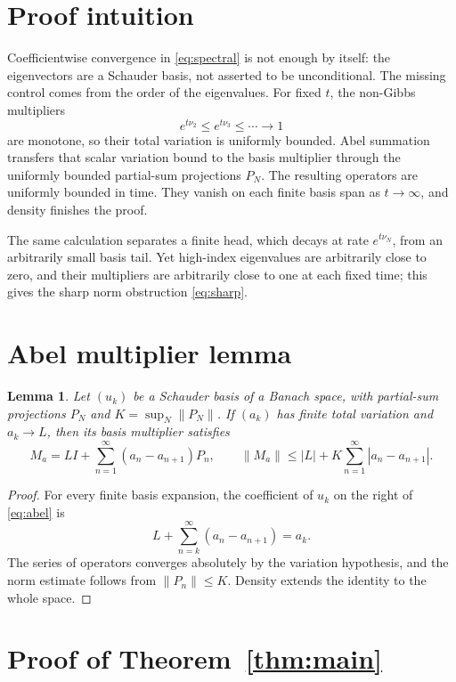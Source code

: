 \documentclass[11pt]{article}
\newtheorem{lemma}{Lemma}
\begin{document}
\section{Proof intuition}

Coefficientwise convergence in \eqref{eq:spectral} is not enough by itself:
the eigenvectors are a Schauder basis, not asserted to be unconditional.
The missing control comes from the order of the eigenvalues.  For fixed $t$,
the non-Gibbs multipliers
\[
 e^{t\nu_2}\leq e^{t\nu_3}\leq\cdots\longrightarrow1
\]
are monotone, so their total variation is uniformly bounded.  Abel summation
transfers that scalar variation bound to the basis multiplier through the
uniformly bounded partial-sum projections $P_N$.  The resulting operators are
uniformly bounded in time.  They vanish on each finite basis span as
$t\to\infty$, and density finishes the proof.

The same calculation separates a finite head, which decays at rate
$e^{t\nu_N}$, from an arbitrarily small basis tail.  Yet high-index
eigenvalues are arbitrarily close to zero, and their multipliers are
arbitrarily close to one at each fixed time; this gives the sharp norm
obstruction \eqref{eq:sharp}.

\section{Abel multiplier lemma}

\begin{lemma}\label{lem:abel}
Let $(u_k)$ be a Schauder basis of a Banach space, with partial-sum
projections $P_N$ and $K=\sup_N\|P_N\|$.  If $(a_k)$ has finite total
variation and $a_k\to L$, then its basis multiplier satisfies
\begin{equation}\label{eq:abel}
 M_a=L I+\sum_{n=1}^{\infty}(a_n-a_{n+1})P_n,
 \qquad
 \|M_a\|\leq |L|+K\sum_{n=1}^{\infty}|a_n-a_{n+1}|.
\end{equation}
\end{lemma}

\begin{proof}
For every finite basis expansion, the coefficient of $u_k$ on the right of
\eqref{eq:abel} is
\[
 L+\sum_{n=k}^{\infty}(a_n-a_{n+1})=a_k.
\]
The series of operators converges absolutely by the variation hypothesis,
and the norm estimate follows from $\|P_n\|\leq K$.  Density extends the
identity to the whole space.
\end{proof}

\section{Proof of Theorem~\ref{thm:main}}
\end{document}
